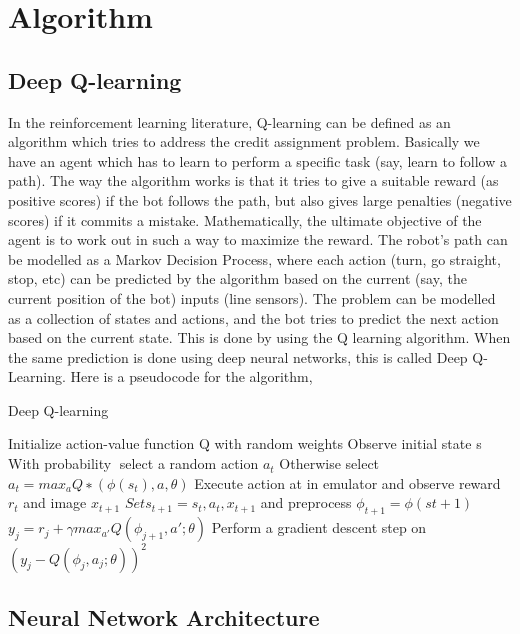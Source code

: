 \documentclass[12pt]{extreport}
\begin{document}
\chapter{Algorithm}

\section{Deep Q-learning}

In the reinforcement learning literature, Q-learning can be defined as an algorithm which tries to address the credit assignment problem. Basically we have an agent which has to learn to perform a specific task (say, learn to follow a path). The way the algorithm works is that it tries to give a suitable reward (as positive scores) if the bot follows the path, but also gives large penalties (negative scores) if it commits a mistake. Mathematically, the ultimate objective of the agent is to work out in such a way to maximize the reward.
The robot’s path can be modelled as a Markov Decision Process, where each action (turn, go straight, stop, etc) can be predicted by the algorithm based on the current (say, the current position of the bot) inputs (line sensors). The problem can be modelled as a collection of states and actions, and the bot tries to predict the next action based on the current state. This is done by using the Q learning algorithm. When the same prediction is done using deep neural networks, this is called Deep Q-Learning.
Here is a pseudocode for the algorithm,

\begin{algorithm}
 \caption{Deep Q-learning}\label{euclid}
 \begin{algorithmic}[1]
  \State Initialize action-value function Q with random weights
  \State Observe initial state s
  \State With probability select a random action $ a_t $
  \State Otherwise select $ a_t = max_a Q ∗ (\phi(s_t), a, \theta) $
  \State Execute action at in emulator and observe reward $ r_t $ and image $ x_{t+1} $
  \State $ Set s_{t+1} = s_t, a_t, x_{t+1} $ and preprocess $ \phi_{t+1} = \phi(st+1) $
  \State $ y_j = r_j + \gamma max_{a'} Q(\phi_{j+1}, a'; \theta) $
  \State Perform a gradient descent step on $ (y_j - Q(\phi_j , a_j ; \theta))^2 $
  \EndFor
  \EndFor
 \end{algorithmic}
\end{algorithm}

\section{Neural Network Architecture}
\end{document}
